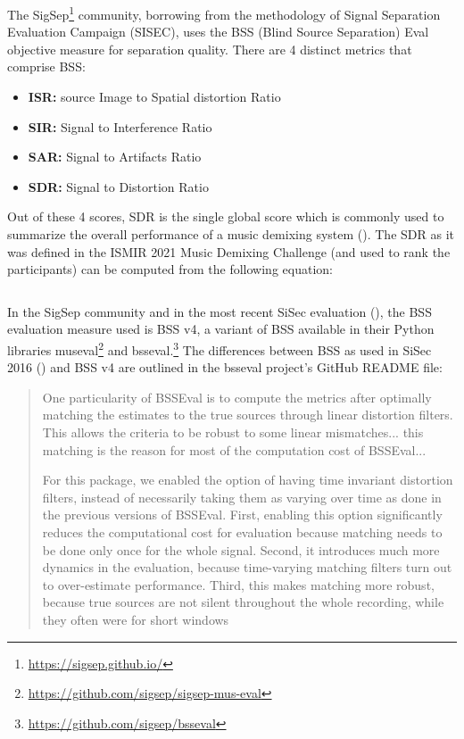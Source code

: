 \documentclass[report.tex]{subfiles}
\begin{document}
The SigSep\footnote{\url{https://sigsep.github.io/}} community, borrowing from the methodology of Signal Separation Evaluation Campaign (SISEC), uses the BSS (Blind Source Separation) Eval \cite{bss} objective measure for separation quality. There are 4 distinct metrics that comprise BSS:

\begin{itemize}
\item
	\textbf{ISR:} source Image to Spatial distortion Ratio
\item
	\textbf{SIR:} Signal to Interference Ratio
\item
	\textbf{SAR:} Signal to Artifacts Ratio
\item
	\textbf{SDR:} Signal to Distortion Ratio
\end{itemize}

Out of these 4 scores, SDR is the single global score which is commonly used to summarize the overall performance of a music demixing system (\cite{sdruseful}). The SDR as it was defined in the ISMIR 2021 Music Demixing Challenge (and used to rank the participants) can be computed from the following equation:

\[ \]

In the SigSep community and in the most recent SiSec evaluation (\cite{sisec2018}), the BSS evaluation measure used is BSS v4, a variant of BSS available in their Python libraries museval\footnote{\url{https://github.com/sigsep/sigsep-mus-eval}} and bsseval.\footnote{\url{https://github.com/sigsep/bsseval}} The differences between BSS as used in SiSec 2016 (\cite{sisec2016}) and BSS v4 are outlined in the bsseval project's GitHub README file:

\begin{quote}
	One particularity of BSSEval is to compute the metrics after optimally matching the estimates to the true sources through linear distortion filters. This allows the criteria to be robust to some linear mismatches... this matching is the reason for most of the computation cost of BSSEval...

	For this package, we enabled the option of having time invariant distortion filters, instead of necessarily taking them as varying over time as done in the previous versions of BSSEval. First, enabling this option significantly reduces the computational cost for evaluation because matching needs to be done only once for the whole signal. Second, it introduces much more dynamics in the evaluation, because time-varying matching filters turn out to over-estimate performance. Third, this makes matching more robust, because true sources are not silent throughout the whole recording, while they often were for short windows
\end{quote}
\end{document}

